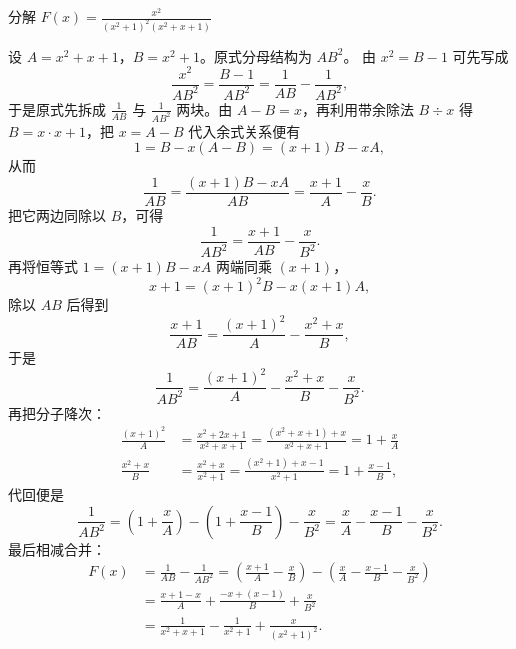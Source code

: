 \begin{example}[分解 $\frac{x^2}{(x^2+1)^2(x^2+x+1)}$]
    分解 $\displaystyle F(x) = \frac{x^2}{(x^2+1)^2(x^2+x+1)}$
\end{example}
\begin{solution}
设 $A = x^2+x+1$，$B = x^2+1$。原式分母结构为 $A B^2$。
由 $x^2=B-1$ 可先写成
$$ \frac{x^2}{A B^2} = \frac{B - 1}{A B^2} = \frac{1}{AB} - \frac{1}{A B^2}, $$
于是原式先拆成 \(\frac{1}{AB}\) 与 \(\frac{1}{AB^2}\) 两块。由 $A-B=x$，再利用带余除法 $B \div x$ 得 $B = x \cdot x + 1$，把 $x=A-B$ 代入余式关系便有
$$ 1 = B - x(A-B) = (x+1)B - xA, $$
从而
$$ \frac{1}{AB} = \frac{(x+1)B - xA}{AB} = \frac{x+1}{A} - \frac{x}{B}. $$
把它两边同除以 $B$，可得
$$ \frac{1}{AB^2} = \frac{x+1}{AB} - \frac{x}{B^2}. $$
再将恒等式 $1 = (x+1)B - xA$ 两端同乘 $(x+1)$，
$$ x+1 = (x+1)^2 B - x(x+1)A, $$
除以 $AB$ 后得到
$$ \frac{x+1}{AB} = \frac{(x+1)^2}{A} - \frac{x^2+x}{B}, $$
于是
$$ \frac{1}{A B^2} = \frac{(x+1)^2}{A} - \frac{x^2+x}{B} - \frac{x}{B^2}. $$
再把分子降次：
\begin{align*}
\frac{(x+1)^2}{A} &= \frac{x^2+2x+1}{x^2+x+1} = \frac{(x^2+x+1)+x}{x^2+x+1} = 1 + \frac{x}{A} \\
\frac{x^2+x}{B} &= \frac{x^2+x}{x^2+1} = \frac{(x^2+1)+x-1}{x^2+1} = 1 + \frac{x-1}{B},
\end{align*}
代回便是
$$ \frac{1}{A B^2} = \left(1 + \frac{x}{A}\right) - \left(1 + \frac{x-1}{B}\right) - \frac{x}{B^2} = \frac{x}{A} - \frac{x-1}{B} - \frac{x}{B^2}. $$
最后相减合并：
\begin{align*}
F(x) &= \frac{1}{AB} - \frac{1}{AB^2} = \left(\frac{x+1}{A} - \frac{x}{B}\right) - \left(\frac{x}{A} - \frac{x-1}{B} - \frac{x}{B^2}\right) \\
&= \frac{x+1-x}{A} + \frac{-x+(x-1)}{B} + \frac{x}{B^2} \\
&= \frac{1}{x^2+x+1} - \frac{1}{x^2+1} + \frac{x}{(x^2+1)^2}.
\end{align*}
\end{solution}

